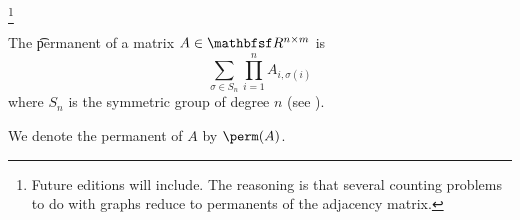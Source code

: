 
\footnote{Future editions will include. The reasoning is that several counting problems to do with graphs reduce to permanents of the adjacency matrix.}


The \t{permanent} of a matrix $A \in \R^{n \times m}$ is
\[
  \sum_{\sigma \in S_n} \prod_{i = 1}^{n} A_{i, \sigma(i)}
\]
where $S_n$ is the symmetric group of degree $n$ (see ).


We denote the permanent of $A$ by $\perm(A)$.


\blankpage
